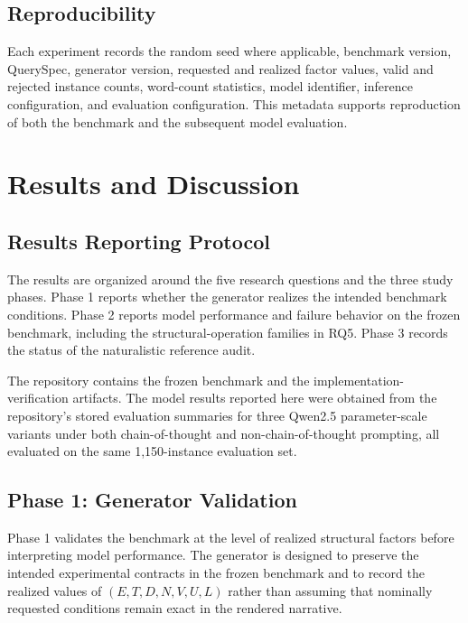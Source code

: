 \documentclass{iutbscthesis}
\begin{document}
\section{Reproducibility}
Each experiment records the random seed where applicable, benchmark version, QuerySpec, generator
version, requested and realized factor values, valid and rejected instance counts, word-count
statistics, model identifier, inference configuration, and evaluation configuration. This metadata
supports reproduction of both the benchmark and the subsequent model evaluation.

\chapter{Results and Discussion}
\label{chap:results}
\section{Results Reporting Protocol}
The results are organized around the five research questions and the three study phases. Phase 1 reports
whether the generator realizes the intended benchmark conditions. Phase 2 reports model performance and
failure behavior on the frozen benchmark, including the structural-operation families in RQ5. Phase 3
records the status of the naturalistic reference audit.

The repository contains the frozen benchmark and the implementation-verification artifacts. The model
results reported here were obtained from the repository's stored evaluation summaries for three
Qwen2.5 parameter-scale variants under both chain-of-thought and non-chain-of-thought prompting, all evaluated on the
same 1,150-instance evaluation set.

\section{Phase 1: Generator Validation}
Phase 1 validates the benchmark at the level of realized structural factors before interpreting model
performance. The generator is designed to preserve the intended experimental contracts in the frozen
benchmark and to record the realized values of $(E,T,D,N,V,U,L)$ rather than assuming that nominally
requested conditions remain exact in the rendered narrative.
\end{document}
